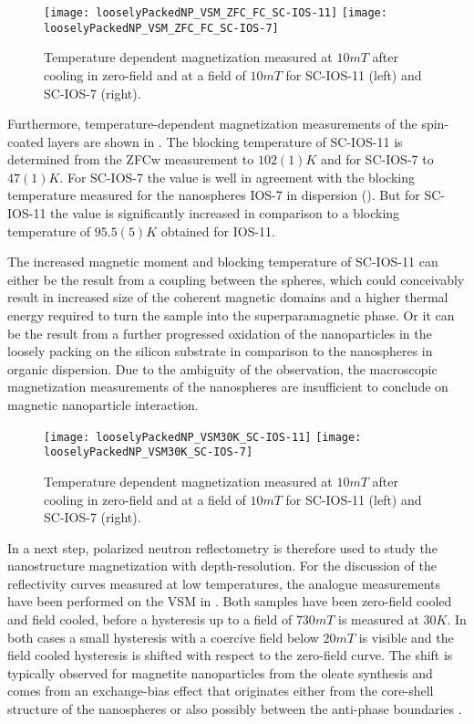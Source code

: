 \documentclass[\main/dresen_thesis.tex]{subfiles}
\begin{document}
  \begin{figure}[tb]
    \centering
    \texttt{[image: looselyPackedNP\_VSM\_ZFC\_FC\_SC-IOS-11]}
    \texttt{[image: looselyPackedNP\_VSM\_ZFC\_FC\_SC-IOS-7]}
    \caption{\label{fig:looselyPackedNP:layer:vsmZFCFC}Temperature dependent magnetization measured at $10 \unit{mT}$ after cooling in zero-field and at a field of $10 \unit{mT}$ for SC-IOS-11 (left) and SC-IOS-7 (right).}
  \end{figure}

  Furthermore, temperature-dependent magnetization measurements of the spin-coated layers are shown in .
  The blocking temperature of SC-IOS-11 is determined from the ZFCw measurement to $102(1) \unit{K}$ and for SC-IOS-7 to $47(1) \unit{K}$.
  For SC-IOS-7 the value is well in agreement with the blocking temperature measured for the nanospheres IOS-7 in dispersion ().
  But for SC-IOS-11 the value is significantly increased in comparison to a blocking temperature of $95.5(5) \unit{K}$ obtained for IOS-11.

  The increased magnetic moment and blocking temperature of SC-IOS-11 can either be the result from a coupling between the spheres, which could conceivably result in increased size of the coherent magnetic domains and a higher thermal energy required to turn the sample into the superparamagnetic phase.
  Or it can be the result from a further progressed oxidation of the nanoparticles in the loosely packing on the silicon substrate in comparison to the nanospheres in organic dispersion.
  Due to the ambiguity of the observation, the macroscopic magnetization measurements of the nanospheres are insufficient to conclude on magnetic nanoparticle interaction.

  \begin{figure}[tb]
    \centering
    \texttt{[image: looselyPackedNP\_VSM30K\_SC-IOS-11]}
    \texttt{[image: looselyPackedNP\_VSM30K\_SC-IOS-7]}
    \caption{\label{fig:looselyPackedNP:layer:vsm30K}Temperature dependent magnetization measured at $10 \unit{mT}$ after cooling in zero-field and at a field of $10 \unit{mT}$ for SC-IOS-11 (left) and SC-IOS-7 (right).}
  \end{figure}
  In a next step, polarized neutron reflectometry is therefore used to study the nanostructure magnetization with depth-resolution.
  For the discussion of the reflectivity curves measured at low temperatures, the analogue measurements have been performed on the VSM in .
  Both samples have been zero-field cooled and field cooled, before a hysteresis up to a field of $730 \unit{mT}$ is measured at $30 \unit{K}$.
  In both cases a small hysteresis with a coercive field below $20 \unit{mT}$ is visible and the field cooled hysteresis is shifted with respect to the zero-field curve.
  The shift is typically observed for magnetite nanoparticles from the oleate synthesis and comes from an exchange-bias effect that originates either from the core-shell structure of the nanospheres or also possibly between the anti-phase boundaries \cite{Wetterskog_2013_Anoma}.
\end{document}

